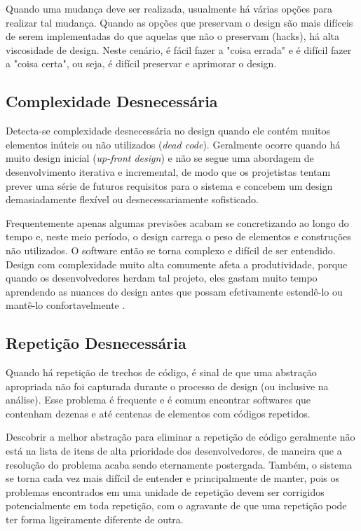 Quando uma mudança deve ser realizada, usualmente há várias opções para realizar
tal mudança. Quando as opções que preservam o design são mais difíceis de serem
implementadas do que aquelas que não o preservam (hacks), há alta viscosidade 
de design. Neste cenário, é fácil fazer a "coisa errada" e é difícil fazer a
"coisa certa", ou seja, é difícil preservar e aprimorar o design.

\subsection{Complexidade Desnecessária}

Detecta-se complexidade desnecessária no design quando ele contém muitos 
elementos inúteis ou não utilizados (\textit{dead code}). Geralmente ocorre
quando há muito design inicial (\textit{up-front design}) e não se segue uma 
abordagem de desenvolvimento iterativa e incremental, de modo que os projetistas
tentam prever uma série de futuros requisitos para o sistema e concebem um 
design demasiadamente flexível ou desnecessariamente sofisticado. 

Frequentemente apenas algumas previsões acabam se concretizando ao longo do
tempo e, neste meio período, o design carrega o peso de elementos e construções 
não utilizados. O software então se torna complexo e difícil de ser entendido. 
Design com complexidade muito alta comumente afeta a produtividade, porque 
quando os desenvolvedores herdam tal projeto, eles gastam muito tempo 
aprendendo as nuances do design antes que possam efetivamente  estendê-lo ou
mantê-lo confortavelmente \cite{kerievsky}.

\subsection{Repetição Desnecessária}

Quando há repetição de trechos de código, é sinal de que uma abstração
apropriada não foi capturada durante o processo de design (ou inclusive na
análise). Esse problema é frequente e é comum encontrar softwares que contenham 
dezenas e até centenas de elementos com códigos repetidos. 

Descobrir a melhor abstração para eliminar a repetição de código geralmente não 
está na lista de itens de alta prioridade dos desenvolvedores, de maneira que a 
resolução do problema acaba sendo eternamente postergada. Também, o sistema se
torna cada vez mais difícil de entender e principalmente de manter, pois os 
problemas encontrados em uma unidade de repetição devem ser corrigidos
potencialmente  em toda repetição, com o agravante de que uma repetição pode
ter forma ligeiramente diferente de outra.

